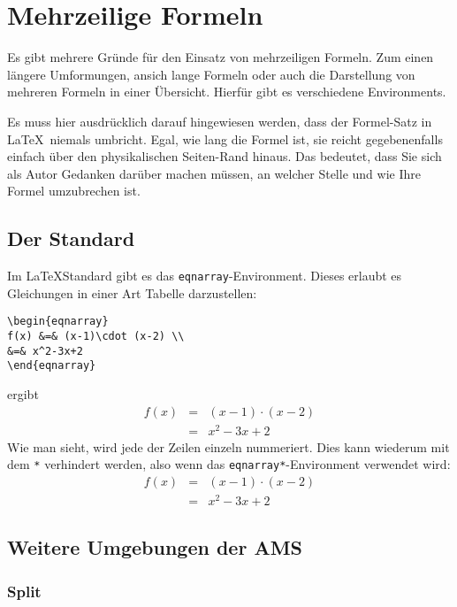 \section{Mehrzeilige Formeln}

Es gibt mehrere Gründe für den Einsatz von mehrzeiligen Formeln. Zum einen längere Umformungen, ansich lange Formeln oder auch die Darstellung von mehreren Formeln in einer Übersicht. Hierfür gibt es verschiedene Environments.

Es muss hier ausdrücklich darauf hingewiesen werden, dass der Formel-Satz in \LaTeX\ niemals umbricht. Egal, wie lang die Formel ist, sie reicht gegebenenfalls einfach über den physikalischen Seiten-Rand hinaus. Das bedeutet, dass Sie sich als Autor Gedanken darüber machen müssen, an welcher Stelle und wie Ihre Formel umzubrechen ist. 

\subsection{Der Standard}

Im \LaTeX\-Standard gibt es das \texttt{eqnarray}-Environment. Dieses erlaubt es Gleichungen in einer Art Tabelle darzustellen:

\begin{verbatim}
\begin{eqnarray}
f(x) &=& (x-1)\cdot (x-2) \\
&=& x^2-3x+2
\end{eqnarray}
\end{verbatim}
ergibt
\begin{eqnarray}
f(x) &=& (x-1)\cdot (x-2) \\
&=& x^2-3x+2
\end{eqnarray}
Wie man sieht, wird jede der Zeilen einzeln nummeriert. Dies kann wiederum mit dem \texttt{*} verhindert werden, also wenn das \texttt{eqnarray*}-Environment verwendet wird:
\begin{eqnarray*}
f(x) &=& (x-1)\cdot (x-2) \\
&=& x^2-3x+2
\end{eqnarray*}

\subsection{Weitere Umgebungen der AMS}

\subsubsection{Split}

